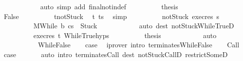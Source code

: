 \begin{isabellebody}
\ \ \ \ \ \ \ \ \ \ \isamarkupfalse%
\ {\isacharparenleft}auto\ simp\ add{\isacharcolon}\ final{\isacharunderscore}notin{\isacharunderscore}def{\isacharparenright}\isanewline
\ \ \ \ \ \ \ \ \isamarkupfalse%
\ {\isacharquery}thesis\ \isacommand{{\isachardot}{\isachardot}}\isamarkupfalse%
\isanewline
\ \ \ \ \ \ \isamarkupfalse%
\isanewline
\ \ \ \ \ \ \ \ \isamarkupfalse%
\ False\isanewline
\ \ \ \ \ \ \ \ \isamarkupfalse%
\ t{\isacharprime}{\isacharunderscore}notStuck\ \isamarkupfalse%
\ t{\isacharprime}{\isacharcolon}\ {\isachardoublequoteopen}t{\isacharprime}{\isacharequal}s{\isacharprime}{\isachardoublequoteclose}\ \isamarkupfalse%
\ simp\isanewline
\ \ \ \ \ \ \ \ \isamarkupfalse%
\ not{\isacharunderscore}Stuck\ exec{\isacharunderscore}res\ s\isanewline
\ \ \ \ \ \ \ \ \isamarkupfalse%
\ {\isachardoublequoteopen}{\isasymGamma}{\isacharbar}\isactrlbsub M\isactrlesub {\isasymturnstile}{\isasymlangle}While\ b\ c{\isacharcomma}s{\isacharprime}\ {\isasymrangle}\ {\isasymRightarrow}{\isasymnotin}{\isacharbraceleft}Stuck{\isacharbraceright}{\isachardoublequoteclose}\isanewline
\ \ \ \ \ \ \ \ \ \ \isamarkupfalse%
\ {\isacharparenleft}auto\ dest{\isacharcolon}\ notStuck{\isacharunderscore}WhileTrueD{}{\isacharparenright}\ \isanewline
\ \ \ \ \ \ \ \ \isamarkupfalse%
\ exec{\isacharunderscore}res\ t{\isacharprime}\ WhileTrue{\isachardot}hyps\isanewline
\ \ \ \ \ \ \ \ \isamarkupfalse%
\ {\isacharquery}thesis\isanewline
\ \ \ \ \ \ \ \ \ \ \isamarkupfalse%
\ auto\isanewline
\ \ \ \ \ \ \isamarkupfalse%
\isanewline
\ \ \ \ \isamarkupfalse%
\isanewline
\ \ \isamarkupfalse%
\isanewline
{}\isamarkupfalse%
\isanewline
\ \ \isamarkupfalse%
\ WhileFalse\ \isamarkupfalse%
\ \isamarkupfalse%
\ {\isacharquery}case\ \isamarkupfalse%
\ {\isacharparenleft}iprover\ intro{\isacharcolon}\ terminates{\isachardot}WhileFalse{\isacharparenright}\isanewline
{}\isamarkupfalse%
\isanewline
\ \ \isamarkupfalse%
\ Call\ \isamarkupfalse%
\ {\isacharquery}case\ \isanewline
\ \ \ \ \isamarkupfalse%
\ {\isacharparenleft}auto\ intro{\isacharcolon}\ terminates{\isachardot}Call\ dest{\isacharcolon}\ notStuck{\isacharunderscore}CallD\ restrict{\isacharunderscore}SomeD{\isacharparenright}\isanewline

\end{isabellebody}
